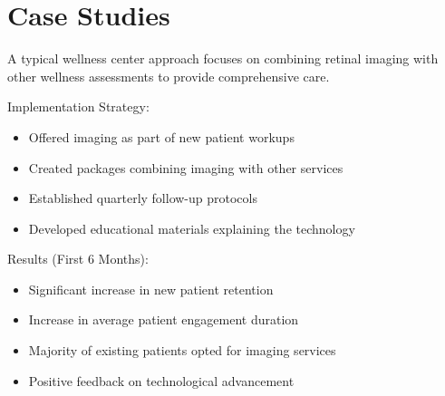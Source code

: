 \documentclass[
  Letterpaper,
]{scrbook}
\providecommand{\tightlist}{%
  \setlength{\itemsep}{0pt}\setlength{\parskip}{0pt}}\usepackage{longtable,booktabs,array}
\begin{document}
\section{Case Studies}\label{case-studies}

\begin{tcolorbox}[enhanced jigsaw, colback=white, colframe=quarto-callout-note-color-frame, breakable, titlerule=0mm, opacitybacktitle=0.6, bottomtitle=1mm, coltitle=black, opacityback=0, bottomrule=.15mm, toptitle=1mm, colbacktitle=quarto-callout-note-color!10!white, rightrule=.15mm, leftrule=.75mm, arc=.35mm, title=\textcolor{quarto-callout-note-color}{\faInfo}\hspace{0.5em}{Case Study 1: Integrative Wellness Center}, toprule=.15mm, left=2mm]

A typical wellness center approach focuses on combining retinal imaging
with other wellness assessments to provide comprehensive care.

Implementation Strategy:

\begin{itemize}
\tightlist
\item
  Offered imaging as part of new patient workups
\item
  Created packages combining imaging with other services
\item
  Established quarterly follow-up protocols
\item
  Developed educational materials explaining the technology
\end{itemize}

Results (First 6 Months):

\begin{itemize}
\tightlist
\item
  Significant increase in new patient retention
\item
  Increase in average patient engagement duration
\item
  Majority of existing patients opted for imaging services
\item
  Positive feedback on technological advancement
\end{itemize}

\end{tcolorbox}
\end{document}
